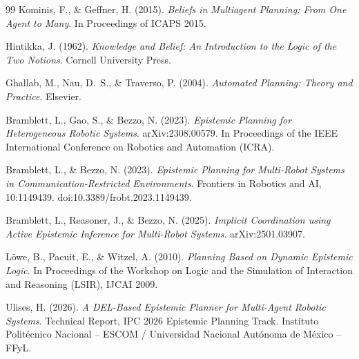\documentclass[12pt,a4paper]{article}
\theoremstyle{definition}
\theoremstyle{plain}
\begin{document}
\begin{thebibliography}{99}
Kominis, F., \& Geffner, H. (2015).
\textit{Beliefs in Multiagent Planning: From One Agent to Many}.
In Proceedings of ICAPS 2015.

Hintikka, J. (1962).
\textit{Knowledge and Belief: An Introduction to the Logic of the Two Notions}.
Cornell University Press.

Ghallab, M., Nau, D.~S., \& Traverso, P. (2004).
\textit{Automated Planning: Theory and Practice}. Elsevier.

Bramblett, L., Gao, S., \& Bezzo, N. (2023).
\textit{Epistemic Planning for Heterogeneous Robotic Systems}.
arXiv:2308.00579. In Proceedings of the IEEE International Conference on
Robotics and Automation (ICRA).

Bramblett, L., \& Bezzo, N. (2023).
\textit{Epistemic Planning for Multi-Robot Systems in
Communication-Restricted Environments}.
Frontiers in Robotics and AI, 10:1149439.
doi:10.3389/frobt.2023.1149439.

Bramblett, L., Reasoner, J., \& Bezzo, N. (2025).
\textit{Implicit Coordination using Active Epistemic Inference
for Multi-Robot Systems}.
arXiv:2501.03907.

L{\"o}we, B., Pacuit, E., \& Witzel, A. (2010).
\textit{Planning Based on Dynamic Epistemic Logic}.
In Proceedings of the Workshop on Logic and the Simulation of
Interaction and Reasoning (LSIR), IJCAI 2009.

Ulises, H. (2026).
\textit{A DEL-Based Epistemic Planner for Multi-Agent Robotic Systems}.
Technical Report, IPC 2026 Epistemic Planning Track.
Instituto Polit\'ecnico Nacional -- ESCOM / Universidad Nacional
Aut\'onoma de M\'exico -- FFyL.

\end{thebibliography}
\end{document}
